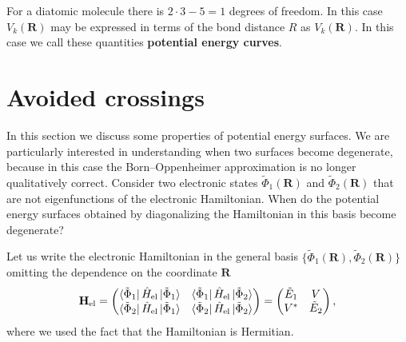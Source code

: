 \documentclass[../Main/chem532-notes.tex]{subfiles}
\begin{document}
\begin{example}
For a diatomic molecule there is $2\cdot3 - 5 = 1$ degrees of freedom. In this case $V_{k}(\mathbf{R})$ may be expressed in terms of the bond distance $R$ as $V_{k}(\mathbf{R})$. In this case we call these quantities \textbf{potential energy curves}.
\end{example}






\section{Avoided crossings}
In this section we discuss some properties of potential energy surfaces. We are particularly interested in understanding when two surfaces become degenerate, because in this case the Born--Oppenheimer approximation is no longer qualitatively correct.
Consider two electronic states $\tilde{\Phi}_1(\mathbf{R})$ and $\tilde{\Phi}_2(\mathbf{R})$ that are not eigenfunctions of the electronic Hamiltonian. When do the potential energy surfaces obtained by diagonalizing the Hamiltonian in this basis become degenerate? 

Let us write the electronic Hamiltonian in the general basis $\{\tilde{\Phi}_1(\mathbf{R}),\tilde{\Phi}_2(\mathbf{R})\}$ omitting the dependence on the coordinate $\mathbf{R}$
\begin{equation}
\mathbf{H}_\mathrm{el} = 
\begin{pmatrix}
\bra{\tilde{\Phi}_1} \hat{H}_\mathrm{el} \ket{\tilde{\Phi}_1} & \bra{\tilde{\Phi}_1} \hat{H}_\mathrm{el} \ket{\tilde{\Phi}_2}\\
\bra{\tilde{\Phi}_2} \hat{H}_\mathrm{el} \ket{\tilde{\Phi}_1} & \bra{\tilde{\Phi}_2} \hat{H}_\mathrm{el} \ket{\tilde{\Phi}_2}
\end{pmatrix}
=
\begin{pmatrix}
\tilde{E}_{1} & V \\
V^* & \tilde{E}_{2}
\end{pmatrix},
\end{equation}
where we used the fact that the Hamiltonian is Hermitian.
\end{document}
